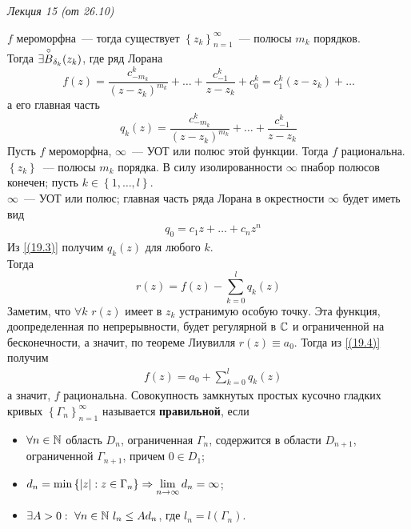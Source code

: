 \begin{flushright}
    \textit{Лекция 15 (от 26.10)}
\end{flushright}
$f$ мероморфна~--- тогда существует $\left\{ z_k \right\}_{n=1}^{\infty}$~---
полюсы $m_k$ порядков.
\\
Тогда $\exists \overset{\circ}{B}_{\delta_k}(z_k)$, где ряд Лорана
\begin{equation}\label{(19.2)}
    f(z) = \frac{c^k_{-m_k}}{(z-z_k)^{m_k}} + \dots + \frac{c^k_{-1}}{z-z_k} + c_0^k= c_1^k(z-z_k) + \dots
\end{equation}
а его главная часть
\begin{equation}\label{(19.3)}
    q_k(z) = \frac{c^k_{-m_k}}{(z-z_k)^{m_k}} + \dots + \frac{c^k_{-1}}{z-z_k}
\end{equation}
\theorem
Пусть $f$ мероморфна, $\infty$~--- УОТ или полюс этой функции. Тогда $f$
рациональна.
\pr
$\left\{ z_k \right\}$~--- полюсы $m_k$ порядка. В силу изолированности $\infty$
пнабор полюсов конечен; пусть $k \in \left\{ 1, \dots, l \right\}$.
\\
$\infty$~--- УОТ или полюс; главная часть ряда Лорана в окрестности $\infty$
будет иметь вид
\begin{align*}
  & q_0 = c_1z+\dots +c_nz^n
\end{align*}
Из \eqref{(19.3)} получим $q_k(z)$ для любого $k$.
\\
Тогда
\begin{equation}\label{(19.4)}
    r(z) = f(z) - \sum_{k=0}^lq_k(z)
\end{equation}
Заметим, что $\forall k$ $r(z)$ имеет в $z_k$ устранимую особую точку. Эта
функция, доопределенная по непрерывности, будет регулярной в $\mathbb{C}$ и
ограниченной на бесконечности, а значит, по теореме Лиувилля $r(z) \equiv a_0$.
Тогда из \eqref{(19.4)} получим
\begin{align*}
  & f(z) = a_0 + \sum_{k=0}^lq_k(z)
\end{align*}
а значит, $f$ рациональна.
\Def
Совокупность замкнутых простых кусочно гладких кривых $\left\{ \Gamma_n
\right\}_{n=1}^\infty$ называется \textbf{правильной}, если
\begin{itemize}
    \item $\forall n \in \mathbb{N}$ область $D_n$, ограниченная $\Gamma_n$, содержится
    в области $D_{n+1}$, ограниченной $\Gamma_{n+1}$, причем $0 \in D_1$;
    \item $d_n = \min \left\{ \left| z \right| : z \in \Gamma_n \right\}
    \Rightarrow \displaystyle \lim_{n \to \infty}d_n = \infty$;
    \item $\exists A > 0: \ \forall n \in \mathbb{N} \ l_n \leq Ad_n$, где $l_n  =
    l(\Gamma_n)$.
\end{itemize}
